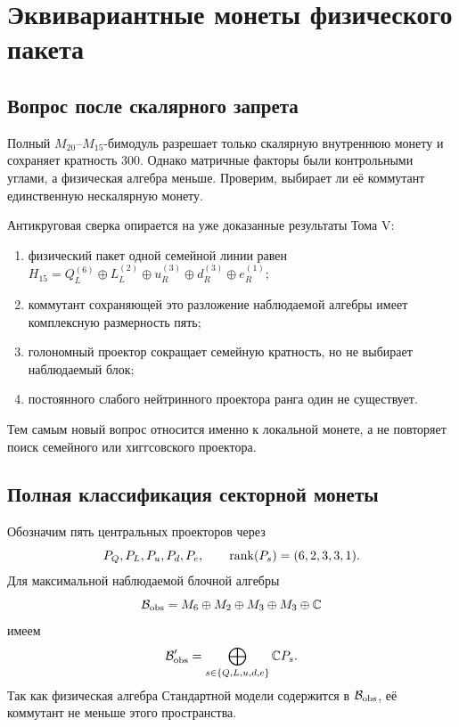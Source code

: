 \chapter{Эквивариантные монеты физического пакета}
\label{ch:v6-spectral-transition-discrete-equivariant-coin-selector-gate}

\section{Вопрос после скалярного запрета}

Полный $M_{20}$--$M_{15}$-бимодуль разрешает только скалярную внутреннюю
монету и сохраняет кратность $300$. Однако матричные факторы были
контрольными углами, а физическая алгебра меньше. Проверим, выбирает ли её
коммутант единственную нескалярную монету.

Антикруговая сверка опирается на уже доказанные результаты Тома V:
\begin{enumerate}
 \item физический пакет одной семейной линии равен
 $H_{15}=Q_L^{(6)}\oplus L_L^{(2)}\oplus u_R^{(3)}\oplus
 d_R^{(3)}\oplus e_R^{(1)}$;
 \item коммутант сохраняющей это разложение наблюдаемой алгебры имеет
 комплексную размерность пять;
 \item голономный проектор сокращает семейную кратность, но не выбирает
 наблюдаемый блок;
 \item постоянного слабого нейтринного проектора ранга один не существует.
\end{enumerate}
Тем самым новый вопрос относится именно к локальной монете, а не повторяет
поиск семейного или хиггсовского проектора.

\section{Полная классификация секторной монеты}

Обозначим пять центральных проекторов через
\begin{equation}
 P_Q,P_L,P_u,P_d,P_e,
 \qquad
 \operatorname{rank}(P_s)=(6,2,3,3,1).
\end{equation}
Для максимальной наблюдаемой блочной алгебры
\begin{equation}
 \mathcal B_{\rm obs}=M_6\oplus M_2\oplus M_3\oplus M_3\oplus\mathbb C
\end{equation}
имеем
\begin{equation}
 \mathcal B_{\rm obs}'=
 \bigoplus_{s\in\{Q,L,u,d,e\}}\mathbb C P_s.
 \label{eq:v6-discrete-coin-observed-commutant}
\end{equation}
Так как физическая алгебра Стандартной модели содержится в
$\mathcal B_{\rm obs}$, её коммутант не меньше этого пространства.

